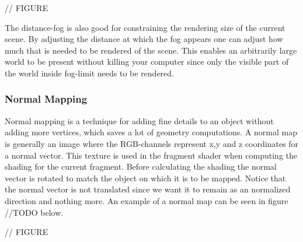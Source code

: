 // FIGURE

The distance-fog is also good for constraining the rendering size of the current scene. By adjusting the distance at which the fog appears one can adjust how much that is needed to be rendered of the scene. This enables an arbitrarily large world to be present without killing your computer since only the visible part of the world inside fog-limit needs to be rendered. 

\subsubsection{Normal Mapping}
Normal mapping is a technique for adding fine details to an object without adding more vertices, which saves a lot of geometry computations. A normal map is generally an image where the RGB-channels represent x,y and z coordinates for a normal vector. This texture is used in the fragment shader when computing the shading for the current fragment. Before calculating the shading the normal vector is rotated to match the object on which it is to be mapped. Notice that the normal vector is not translated since we want it to remain as an normalized direction and nothing more. An example of a normal map can be seen in figure //TODO below.

// FIGURE